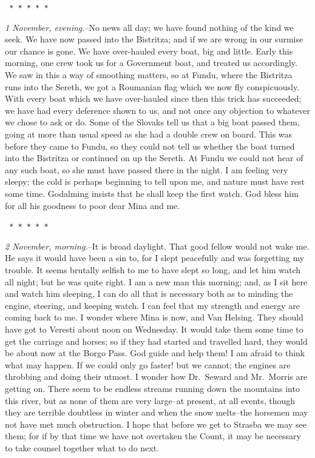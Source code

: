 \documentclass[12pt,openright]{book}
\begin{document}
\texttt{   *       *       *       *       *}

\textit{1 November, evening.}–No news all day; we have found nothing of the kind we seek. We have now passed into the Bistritza; and if we are wrong in our surmise our chance is gone. We have over-hauled every boat, big and little. Early this morning, one crew took us for a Government boat, and treated us accordingly. We saw in this a way of smoothing matters, so at Fundu, where the Bistritza runs into the Sereth, we got a Roumanian flag which we now fly conspicuously. With every boat which we have over-hauled since then this trick has succeeded; we have had every deference shown to us, and not once any objection to whatever we chose to ask or do. Some of the Slovaks tell us that a big boat passed them, going at more than usual speed as she had a double crew on board. This was before they came to Fundu, so they could not tell us whether the boat turned into the Bistritza or continued on up the Sereth. At Fundu we could not hear of any such boat, so she must have passed there in the night. I am feeling very sleepy; the cold is perhaps beginning to tell upon me, and nature must have rest some time. Godalming insists that he shall keep the first watch. God bless him for all his goodness to poor dear Mina and me.

\texttt{   *       *       *       *       *}

\textit{2 November, morning.}–It is broad daylight. That good fellow would not wake me. He says it would have been a sin to, for I slept peacefully and was forgetting my trouble. It seems brutally selfish to me to have slept so long, and let him watch all night; but he was quite right. I am a new man this morning; and, as I sit here and watch him sleeping, I can do all that is necessary both as to minding the engine, steering, and keeping watch. I can feel that my strength and energy are coming back to me. I wonder where Mina is now, and Van Helsing. They should have got to Veresti about noon on Wednesday. It would take them some time to get the carriage and horses; so if they had started and travelled hard, they would be about now at the Borgo Pass. God guide and help them! I am afraid to think what may happen. If we could only go faster! but we cannot; the engines are throbbing and doing their utmost. I wonder how Dr. Seward and Mr. Morris are getting on. There seem to be endless streams running down the mountains into this river, but as none of them are very large–at present, at all events, though they are terrible doubtless in winter and when the snow melts–the horsemen may not have met much obstruction. I hope that before we get to Strasba we may see them; for if by that time we have not overtaken the Count, it may be necessary to take counsel together what to do next.
\end{document}
